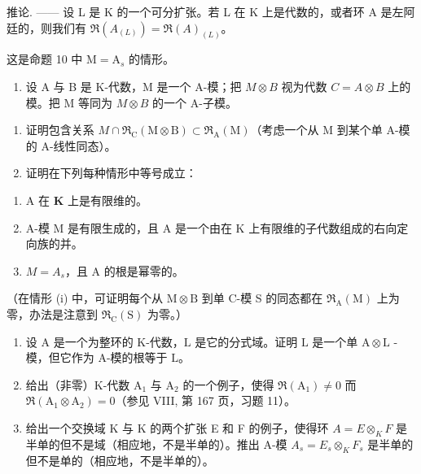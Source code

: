 推论. —— 设 L 是 K 的一个可分扩张。若 L 在 K 上是代数的，或者环 A 是左阿廷的，则我们有 \(\mathfrak{R}(A_{(L)}) = \mathfrak{R}(A)_{(L)}\)。

这是命题 10 中 \(\mathrm{M} = \mathrm{A}_s\) 的情形。


\begin{enumerate}
\def\labelenumi{\arabic{enumi})}
\tightlist
\item
  设 A 与 B 是 K-代数，M 是一个 A-模；把 \(M \otimes B\) 视为代数 \(C = A \otimes B\) 上的模。把 M 等同为 \(M \otimes B\) 的一个 A-子模。
\end{enumerate}

\begin{enumerate}
\def\labelenumi{\alph{enumi})}
\item
  证明包含关系 \(M \cap \mathfrak{R}_{\mathrm{C}}(\mathrm{M} \otimes \mathrm{B}) \subset \mathfrak{R}_{\mathrm{A}}(\mathrm{M})\)（考虑一个从 M 到某个单 A-模的 A-线性同态）。
\item
  证明在下列每种情形中等号成立：
\end{enumerate}

\begin{enumerate}
\def\labelenumi{(\roman{enumi})}
\item
  A 在 \(\mathbf{K}\) 上是有限维的。
\item
  A-模 M 是有限生成的，且 A 是一个由在 K 上有限维的子代数组成的右向定向族的并。
\item
  \(M = A_{s}\)，且 A 的根是幂零的。
\end{enumerate}

（在情形 (i) 中，可证明每个从 \(\mathrm{M} \otimes \mathrm{B}\) 到单 C-模 S 的同态都在 \(\Re_{\mathrm{A}}(\mathrm{M})\) 上为零，办法是注意到 \(\Re_{\mathrm{C}}(\mathrm{S})\) 为零。）

\begin{enumerate}
\def\labelenumi{\arabic{enumi})}
\setcounter{enumi}{1}
\item
  设 \(\mathrm{A}\) 是一个为整环的 K-代数，\(\mathrm{L}\) 是它的分式域。证明 \(\mathrm{L}\) 是一个单 \(\mathrm{A} \otimes \mathrm{L}\) -模，但它作为 A-模的根等于 \(\mathrm{L}\)。
\item
  给出（非零）K-代数 \(\mathrm{A}_1\) 与 \(\mathrm{A}_2\) 的一个例子，使得 \(\Re (\mathrm{A}_1)\neq 0\) 而 \(\Re (\mathrm{A}_1\otimes \mathrm{A}_2) = 0\)（参见 VIII, 第 167 页，习题 11）。
\item
  给出一个交换域 K 与 K 的两个扩张 E 和 F 的例子，使得环 \(A = E \otimes_{K} F\) 是半单的但不是域（相应地，不是半单的）。推出 A-模 \(A_{s} = E_{s} \otimes_{K} F_{s}\) 是半单的但不是单的（相应地，不是半单的）。
\end{enumerate}

